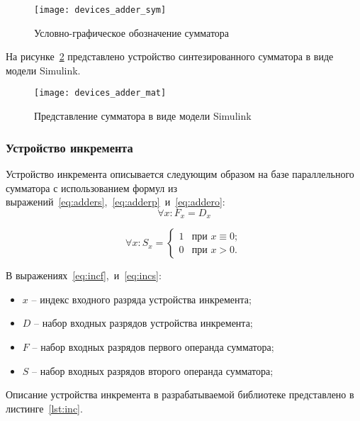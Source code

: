 \documentclass[document.tex]{subfiles}
\begin{document}
\begin{figure}[here]
\centering
\texttt{[image: devices\_adder\_sym]}
\caption{Условно-графическое обозначение сумматора}
\label{fig:deviceadder}
\end{figure}

На рисунке~\ref{fig:deviceaddermat} представлено устройство
синтезированного сумматора в виде модели Simulink.

\begin{figure}[here]
\texttt{[image: devices\_adder\_mat]}
\caption{Представление сумматора в виде модели Simulink}
\label{fig:deviceaddermat}
\end{figure}

\clearpage
\subsubsection{Устройство инкремента}

Устройство инкремента описывается следующим образом на базе параллельного
сумматора с использованием формул из
выражений~\ref{eq:adders},~\ref{eq:adderp}~и~\ref{eq:addero}:
\begin{equation}
\label{eq:incf}
\forall x: F_x = D_x 
\end{equation}

\begin{equation}
\label{eq:incs}
\forall x: S_x = \begin{cases}
1 &\mbox{при } x \equiv 0; \\
0 &\mbox{при } x > 0.
\end{cases}
\end{equation}

В выражениях~\ref{eq:incf},~и~\ref{eq:incs}:
\begin{itemize}[noitemsep]
  \item $x$ -- индекс входного разряда устройства инкремента;
  \item $D$ -- набор входных разрядов устройства инкремента;
  \item $F$ -- набор входных разрядов первого операнда сумматора;
  \item $S$ -- набор входных разрядов второго операнда сумматора;
\end{itemize}

\clearpage

Описание устройства инкремента в разрабатываемой библиотеке представлено в
листинге~\ref{lst:inc}.
\end{document}
